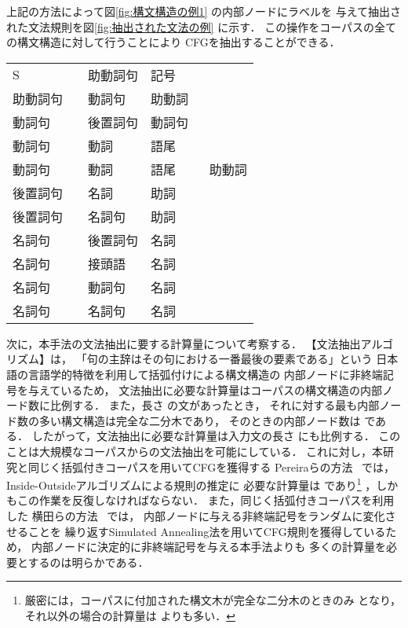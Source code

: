 \bigskip
上記の方法によって図\ref{fig:構文構造の例1} の内部ノードにラベルを
与えて抽出された文法規則を図\ref{fig:抽出された文法の例} に示す．
この操作をコーパスの全ての構文構造に対して行うことにより
CFGを抽出することができる．

\begin{center}
  \small
  \smallskip
  \begin{tabular}{lcll}
    S        &  & 助動詞句 & 記号 \\
    助動詞句 &  & 動詞句 & 助動詞 \\
    動詞句   &  & 後置詞句 & 動詞句 \\
    動詞句   &  & 動詞 & 語尾 \\
    動詞句   &  & 動詞 & 語尾 ~~~~ 助動詞 \\
    後置詞句 &  & 名詞 & 助詞 \\
    後置詞句 &  & 名詞句 & 助詞 \\
    名詞句   &  & 後置詞句 & 名詞 \\
    名詞句   &  & 接頭語 & 名詞 \\
    名詞句   &  & 動詞句 & 名詞 \\
    名詞句   &  & 名詞句 & 名詞 \\
  \end{tabular}

  \bigskip
\end{center}

次に，本手法の文法抽出に要する計算量について考察する．
【文法抽出アルゴリズム】は，
「句の主辞はその句における一番最後の要素である」という
日本語の言語学的特徴を利用して括弧付けによる構文構造の
内部ノードに非終端記号を与えているため，
文法抽出に必要な計算量はコーパスの構文構造の内部ノード数に比例する．
また，長さ  の文があったとき，
それに対する最も内部ノード数の多い構文構造は完全な二分木であり，
そのときの内部ノード数は  である．
したがって，文法抽出に必要な計算量は入力文の長さ  にも比例する．
このことは大規模なコーパスからの文法抽出を可能にしている．
これに対し，本研究と同じく括弧付きコーパスを用いてCFGを獲得する
Pereiraらの方法~ では，
Inside-Outsideアルゴリズムによる規則の推定に
必要な計算量は であり\footnote{
  厳密には，コーパスに付加された構文木が完全な二分木のときのみ
   となり，それ以外の場合の計算量は よりも多い．}
，しかもこの作業を反復しなければならない．
また，同じく括弧付きコーパスを利用した
横田らの方法~ では，
内部ノードに与える非終端記号をランダムに変化させることを
繰り返すSimulated Annealing法を用いてCFG規則を獲得しているため，
内部ノードに決定的に非終端記号を与える本手法よりも
多くの計算量を必要とするのは明らかである．



